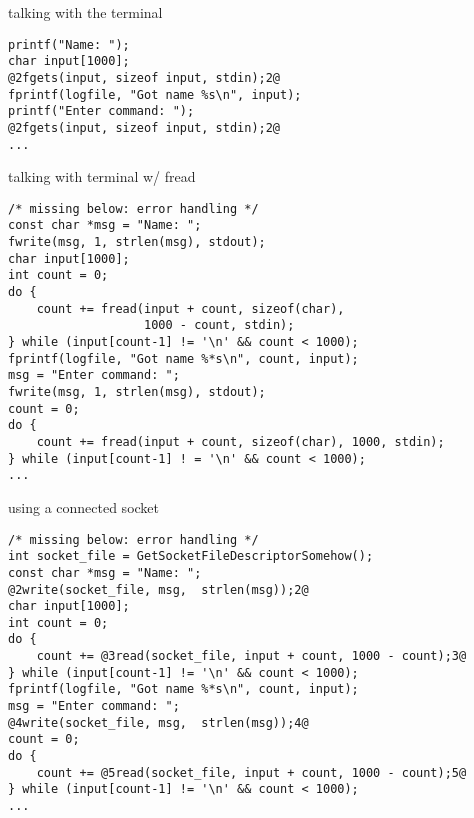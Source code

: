 \begin{frame}[fragile]{talking with the terminal}
\begin{lstlisting}
printf("Name: ");
char input[1000];
@2fgets(input, sizeof input, stdin);2@
fprintf(logfile, "Got name %s\n", input);
printf("Enter command: ");
@2fgets(input, sizeof input, stdin);2@
...
\end{lstlisting}
\end{frame}

\begin{frame}[fragile]{talking with terminal w/ fread}
\begin{lstlisting}
/* missing below: error handling */
const char *msg = "Name: ";
fwrite(msg, 1, strlen(msg), stdout);
char input[1000];
int count = 0;
do {
    count += fread(input + count, sizeof(char),
                   1000 - count, stdin);
} while (input[count-1] != '\n' && count < 1000);
fprintf(logfile, "Got name %*s\n", count, input);
msg = "Enter command: ";
fwrite(msg, 1, strlen(msg), stdout);
count = 0;
do {
    count += fread(input + count, sizeof(char), 1000, stdin);
} while (input[count-1] ! = '\n' && count < 1000);
...
\end{lstlisting}
\end{frame}



\begin{frame}[fragile]{using a connected socket}
\begin{lstlisting}
/* missing below: error handling */
int socket_file = GetSocketFileDescriptorSomehow();
const char *msg = "Name: ";
@2write(socket_file, msg,  strlen(msg));2@
char input[1000];
int count = 0;
do {
    count += @3read(socket_file, input + count, 1000 - count);3@
} while (input[count-1] != '\n' && count < 1000);
fprintf(logfile, "Got name %*s\n", count, input);
msg = "Enter command: ";
@4write(socket_file, msg,  strlen(msg));4@
count = 0;
do {
    count += @5read(socket_file, input + count, 1000 - count);5@
} while (input[count-1] != '\n' && count < 1000);
...
\end{lstlisting}
\end{frame}
